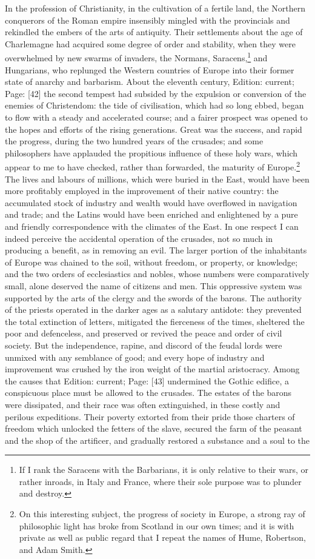 In the profession of Christianity, in the cultivation of a fertile land, the Northern conquerors of the Roman empire insensibly mingled with the provincials and rekindled the embers of the arts of antiquity. Their settlements about the age of Charlemagne had acquired some degree of order and stability, when they were overwhelmed by new swarms of invaders, the Normans, Saracens,\footnote{If I rank the Saracens with the Barbarians, it is only relative to their wars, or rather inroads, in Italy and France, where their sole purpose was to plunder and destroy.} and Hungarians, who replunged the Western countries of Europe into their former state of anarchy and barbarism. About the eleventh century, Edition: current; Page: [42] the second tempest had subsided by the expulsion or conversion of the enemies of Christendom: the tide of civilisation, which had so long ebbed, began to flow with a steady and accelerated course; and a fairer prospect was opened to the hopes and efforts of the rising generations. Great was the success, and rapid the progress, during the two hundred years of the crusades; and some philosophers have applauded the propitious influence of these holy wars, which appear to me to have checked, rather than forwarded, the maturity of Europe.\footnote{On this interesting subject, the progress of society in Europe, a strong ray of philosophic light has broke from Scotland in our own times; and it is with private as well as public regard that I repeat the names of Hume, Robertson, and Adam Smith.} The lives and labours of millions, which were buried in the East, would have been more profitably employed in the improvement of their native country: the accumulated stock of industry and wealth would have overflowed in navigation and trade; and the Latins would have been enriched and enlightened by a pure and friendly correspondence with the climates of the East. In one respect I can indeed perceive the accidental operation of the crusades, not so much in producing a benefit, as in removing an evil. The larger portion of the inhabitants of Europe was chained to the soil, without freedom, or property, or knowledge; and the two orders of ecclesiastics and nobles, whose numbers were comparatively small, alone deserved the name of citizens and men. This oppressive system was supported by the arts of the clergy and the swords of the barons. The authority of the priests operated in the darker ages as a salutary antidote: they prevented the total extinction of letters, mitigated the fierceness of the times, sheltered the poor and defenceless, and preserved or revived the peace and order of civil society. But the independence, rapine, and discord of the feudal lords were unmixed with any semblance of good; and every hope of industry and improvement was crushed by the iron weight of the martial aristocracy. Among the causes that Edition: current; Page: [43] undermined the Gothic edifice, a conspicuous place must be allowed to the crusades. The estates of the barons were dissipated, and their race was often extinguished, in these costly and perilous expeditions. Their poverty extorted from their pride those charters of freedom which unlocked the fetters of the slave, secured the farm of the peasant and the shop of the artificer, and gradually restored a substance and a soul to the 